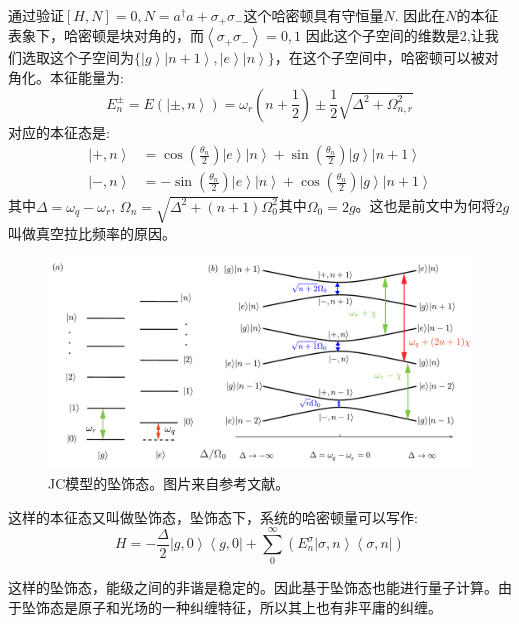 \documentclass[supercite]{HustGraduPaper}
\newcommand{\bra}[1]{\left\langle #1 \right|}
\newcommand{\ket}[1]{\left| #1 \right\rangle}
\begin{document}
通过验证$[H,N] = 0,N = a^\dagger a + \sigma_+ \sigma_-$这个哈密顿具有守恒量$N$. 因此在$N$的本征表象下，哈密顿是块对角的，而$\left \langle \sigma_+ \sigma_- \right\rangle = 0,1$
因此这个子空间的维数是2,让我们选取这个子空间为$\{\ket{g}\ket{n+1}, \ket{e}\ket{n}\}$，在这个子空间中，哈密顿可以被对角化。本征能量为:
\begin{equation}
E_n^\pm = E(\ket{\pm,n}) = \omega_r (n+\frac{1}{2})\pm \frac{1}{2} \sqrt{\Delta^2 +\Omega_{n,r}^2}
\end{equation}
对应的本征态是:
\begin{equation}
\begin{aligned}
\ket{+,n} &= \cos(\frac{\theta_n}{2})\ket{e}\ket{n} + \sin(\frac{\theta_n}{2})\ket{g}\ket{n+1}\\
\ket{-,n} &= -\sin(\frac{\theta_n}{2})\ket{e}\ket{n} + \cos(\frac{\theta_n}{2})\ket{g}\ket{n+1}
\end{aligned}
\end{equation}
其中$\Delta = \omega_q - \omega_r$, $\Omega_n = \sqrt{\Delta^2 + (n+1)\Omega_0^2}$其中$\Omega_0 = 2g$。这也是前文中为何将$2g$叫做真空拉比频率的原因。

\begin{figure}[h]
	\centering
	\includegraphics[width=0.9\linewidth]{Figures/review/DressedStates}
	\caption{JC模型的坠饰态。图片来自参考文献\cite{GU20171}。}
	\label{fig:dressedstates}
\end{figure}
这样的本征态又叫做坠饰态，坠饰态下，系统的哈密顿量可以写作:
\begin{equation}
H = -\frac{\Delta}{2}\ket{g,0} \bra{g,0} + \sum_{0}^{\infty} (E^\sigma_n \ket{\sigma,n} \bra{\sigma,n})
\end{equation}

这样的坠饰态，能级之间的非谐是稳定的。因此基于坠饰态也能进行量子计算\cite{timoney2011quantum}。由于坠饰态是原子和光场的一种纠缠特征，所以其上也有非平庸的纠缠\cite{phoenix1991establishment}。
\end{document}
